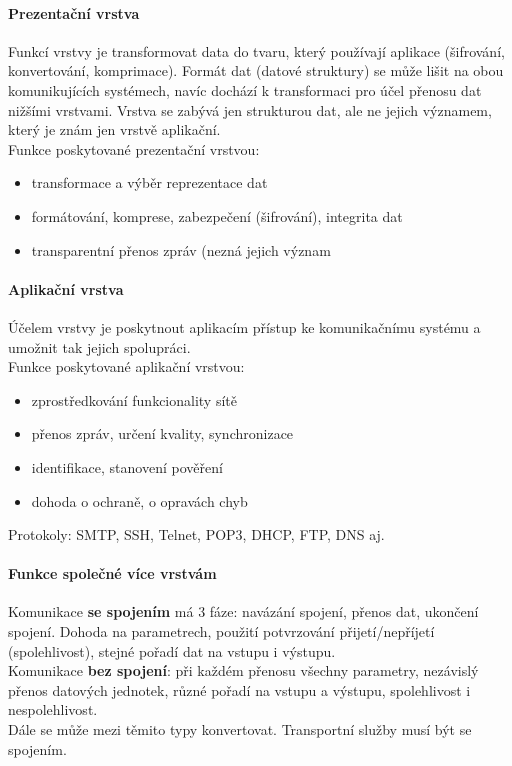 \documentclass[10pt,a4paper]{article}
\begin{document}
\paragraph{Prezentační vrstva} Funkcí vrstvy je transformovat data do tvaru, který používají aplikace (šifrování, konvertování, komprimace). Formát dat (datové struktury) se může lišit na obou komunikujících systémech, navíc dochází k transformaci pro účel přenosu dat nižšími vrstvami. Vrstva se zabývá jen strukturou dat, ale ne jejich významem, který je znám jen vrstvě aplikační. \\
Funkce poskytované prezentační vrstvou:
\begin{itemize}
	\item transformace a výběr reprezentace dat
	\item formátování, komprese, zabezpečení (šifrování), integrita dat
	\item transparentní přenos zpráv (nezná jejich význam
\end{itemize}
\paragraph{Aplikační vrstva} Účelem vrstvy je poskytnout aplikacím přístup ke komunikačnímu systému a umožnit tak jejich spolupráci. \\
Funkce poskytované aplikační vrstvou:
\begin{itemize}
	\item zprostředkování funkcionality sítě
	\item přenos zpráv, určení kvality, synchronizace
	\item identifikace, stanovení pověření
	\item dohoda o ochraně, o opravách chyb
\end{itemize}
Protokoly: SMTP, SSH, Telnet, POP3, DHCP, FTP, DNS aj.
\paragraph{Funkce společné více  vrstvám}
Komunikace \textbf{se spojením} má 3 fáze: navázání spojení, přenos dat, ukončení spojení. Dohoda na parametrech, použití potvrzování přijetí/nepříjetí (spolehlivost), stejné pořadí dat na vstupu i výstupu. \\
Komunikace \textbf{bez spojení}: při každém přenosu všechny parametry, nezávislý přenos datových jednotek, různé pořadí na vstupu a výstupu, spolehlivost i nespolehlivost. \\
Dále se může mezi těmito typy konvertovat. Transportní služby musí být se spojením.
\end{document}
